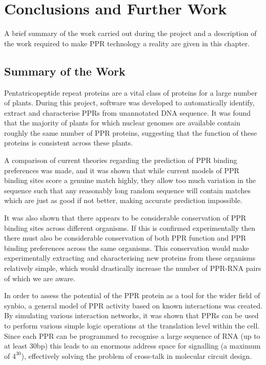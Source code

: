 
\chapter{Conclusions and Further Work}
\label{chap:Conclusions} 

\lettrine{A}{} brief summary of the work carried out during the project and a 
description of the work required to make PPR technology a reality are given in 
this chapter.

\section{Summary of the Work}

Pentatricopeptide repeat proteins are a vital class of proteins for a large
number of plants.
During this project, software was developed to automatically identify, extract 
and characterise PPRs from unannotated DNA sequence.
It was found that the majority of plants for which nuclear genomes are 
available contain roughly the same number of PPR proteins, suggesting that the
function of these proteins is consistent across these plants.

A comparison of current theories regarding the prediction of PPR binding
preferences was made, and it was shown that while current models of PPR binding
sites score a genuine match highly, they allow too much variation in the
sequence such that any reasonably long random sequence will contain matches 
which are just as good if not better, making accurate prediction impossible.

It was also shown that there appears to be considerable conservation of PPR 
binding sites across different organisms.
If this is confirmed experimentally then there must also be considerable 
conservation of both PPR function and PPR binding preferences across the same 
organisms.
This conservation would make experimentally extracting and characterising new
proteins from these organisms relatively simple, which would drastically 
increase the number of PPR-RNA pairs of which we are aware.

In order to assess the potential of the PPR protein as a tool for the wider
field of synbio, a general model of PPR activity based on known interactions
was created.
By simulating various interaction networks, it was shown that PPRs can be 
used to perform various simple logic operations at the translation level within
the cell.
Since each PPR can be programmed to recognise a large sequence of RNA (up to at
least $30$bp) this leads to an enormous address space for signalling (a maximum
of $4^{30}$), effectively solving the problem of cross-talk in molecular 
circuit design.

